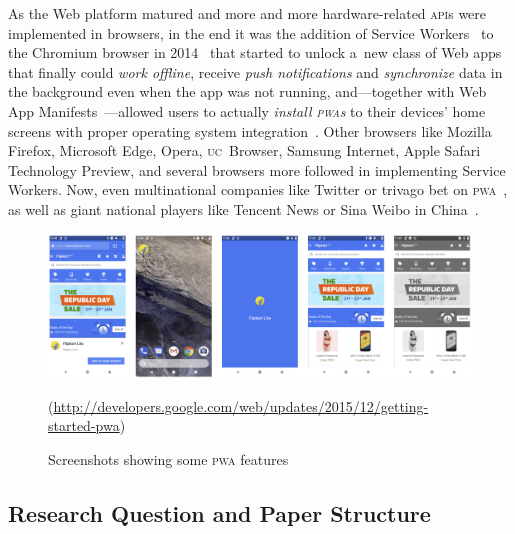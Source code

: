 \documentclass[sigconf]{acmart}
\begin{document}
As the Web platform matured and more and more
hardware-related \textsc{api}s were implemented in browsers,
in the end it was the addition of Service Workers~\cite{russell2017serviceworkers}
to the Chromium browser in 2014~\cite{cooney2014chromium} that started to unlock a~new class of Web apps
that finally could \emph{work offline}, receive \emph{push notifications}
and \emph{synchronize} data in the background even when the app was not running,
and---together with Web App Manifests~\cite{caceres2017manifest}---allowed
users to actually \emph{install \textsc{pwa}s} to their devices' home screens
with proper operating system integration~\cite{kinlan2017a2hs}.
Other browsers like Mozilla Firefox, Microsoft Edge, Opera, \textsc{uc}~Browser, Samsung Internet,
Apple Safari Technology Preview, and several browsers more followed in implementing Service Workers.
Now, even multinational companies like Twitter
or trivago bet on \textsc{pwa}~\cite{gallagher2017twitterlite,twg2017trivago},
as well as giant national players like Tencent News or Sina Weibo in China~\cite{zhu2017pwa}.

\begin{figure}[hbt]
  \centering
  \includegraphics[width=\columnwidth]{pwa-features}
  \caption[Screenshots showing some \textsc{pwa} features]{
    Screenshots showing some \textsc{pwa} features}
    \small (\url{http://developers.google.com/web/updates/2015/12/getting-started-pwa}) 
  \label{fig:pwa-features}
\end{figure}

\subsection{Research Question and Paper Structure}
\end{document}
